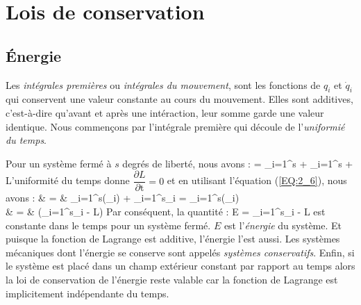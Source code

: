 \chapter{Lois de conservation}

\section{\'Energie}\label{PAR:6}

Les \emph{int\'egrales premi\`eres} ou \emph{int\'egrales du mouvement}, sont les fonctions de $q_{i}$ et $\dot{q}_{i}$ qui conservent une valeur constante au cours du mouvement. Elles sont additives, c'est-\`a-dire qu'avant et après une int\'eraction, leur somme garde une valeur identique. Nous commen\c{c}ons par l'int\'egrale premi\`ere qui d\'ecoule de l'\emph{uniformi\'e du temps}.

Pour un syst\`eme ferm\'e \`a $s$ degr\'es de libert\'e, nous avons :
\benn
	 = \sum_{i=1}^{s} + \sum_{i=1}^{s} + 
\eenn
L'uniformit\'e du temps donne $\dfrac{\partial L}{\partial \mathrm{t}} = 0$ et en utilisant l'\'equation (\ref{EQ:2_6}), nous avons :
\bea
	 & = & \sum_{i=1}^{s}\left(_{i}\right) + \sum_{i=1}^{s}_{i} = \sum_{i=1}^{s}\left(_{i}\right) \nonumber \\
	 & = & \left(\sum_{i=1}^{s}_{i} - L\right) \nonumber
\eea
Par cons\'equent, la quantit\'e :
\be
	E = \sum_{i=1}^{s}_{i} - L \label{EQ:6_1}
\ee
est constante dans le temps pour un syst\`eme ferm\'e. $E$ est l'\emph{\'energie} du syst\`eme. Et puisque la fonction de Lagrange est additive, l'\'energie l'est aussi. Les syst\`emes m\'ecaniques dont l'\'energie se conserve sont appel\'es \emph{syst\`emes conservatifs}. Enfin, si le syst\`eme est plac\'e dans un champ ext\'erieur constant par rapport au temps alors la loi de conservation de l'\'energie reste valable car la fonction de Lagrange est implicitement ind\'ependante du temps.

